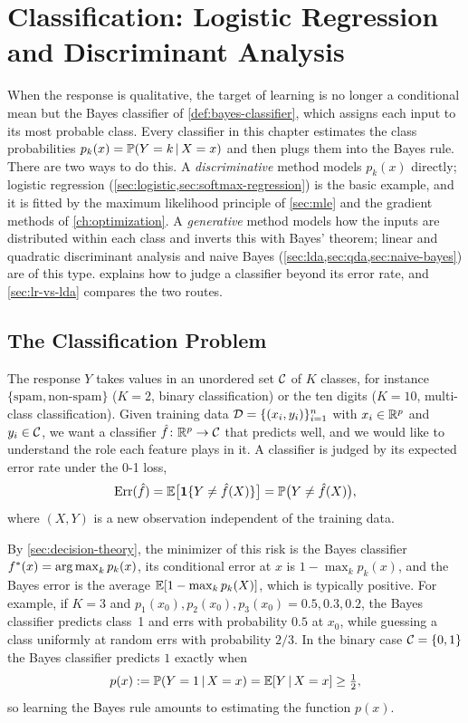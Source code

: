 \chapter{Classification: Logistic Regression and Discriminant Analysis}\label{ch:classification}

When the response is qualitative, the target of learning is no longer a conditional mean but the Bayes classifier of \cref{def:bayes-classifier}, which assigns each input to its most probable class. Every classifier in this chapter estimates the class probabilities $p_k(x)=\mathbb{P}(Y=k\,|\, X=x)$ and then plugs them into the Bayes rule. There are two ways to do this. A \emph{discriminative} method models $p_k(x)$ directly; logistic regression (\cref{sec:logistic,sec:softmax-regression}) is the basic example, and it is fitted by the maximum likelihood principle of \cref{sec:mle} and the gradient methods of \cref{ch:optimization}. A \emph{generative} method models how the inputs are distributed within each class and inverts this with Bayes' theorem; linear and quadratic discriminant analysis and naive Bayes (\cref{sec:lda,sec:qda,sec:naive-bayes}) are of this type.  explains how to judge a classifier beyond its error rate, and \cref{sec:lr-vs-lda} compares the two routes.

\section{The Classification Problem}\label{sec:classification-setup}

The response $Y$ takes values in an unordered set $\mathcal{C}$ of $K$ classes, for instance $\{\text{spam},\text{non-spam}\}$ ($K=2$, binary classification) or the ten digits ($K=10$, multi-class classification). Given training data $\mathcal{D}=\{(x_i,y_i)\}_{i=1}^n$ with $x_i\in\mathbb{R}^p$ and $y_i\in\mathcal{C}$, we want a classifier $\hat f\colon\mathbb{R}^p\to\mathcal{C}$ that predicts well, and we would like to understand the role each feature plays in it. A classifier is judged by its expected error rate under the 0-1 loss,
\[
\operatorname{Err}(\hat f)=\mathbb{E}\big[\mathbf{1}\{Y\ne\hat f(X)\}\big]=\mathbb{P}\big(Y\ne\hat f(X)\big),
\]
where $(X,Y)$ is a new observation independent of the training data.

By \cref{sec:decision-theory}, the minimizer of this risk is the Bayes classifier $f^*(x)=\operatorname*{arg\,max}_kp_k(x)$, its conditional error at $x$ is $1-\max_kp_k(x)$, and the Bayes error is the average $\mathbb{E}[1-\max_kp_k(X)]$, which is typically positive. For example, if $K=3$ and $p_1(x_0),p_2(x_0),p_3(x_0)=0.5,0.3,0.2$, the Bayes classifier predicts class~1 and errs with probability $0.5$ at $x_0$, while guessing a class uniformly at random errs with probability $2/3$. In the binary case $\mathcal{C}=\{0,1\}$ the Bayes classifier predicts $1$ exactly when
\[
p(x):=\mathbb{P}(Y=1\,|\, X=x)=\mathbb{E}[Y\,|\, X=x]\ge\tfrac12,
\]
so learning the Bayes rule amounts to estimating the function $p(x)$.

